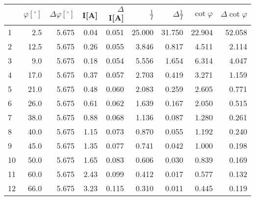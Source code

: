 \begin{tabular}{lrrrrrrrr}
\toprule
{} &  $\varphi[^\circ]$ &  $\Delta \varphi[^\circ]$ &  I[A] &  $\Delta$I[A] &  $\frac{1}{I}$ &  $\Delta \frac{1}{I}$ &  $\cot{\varphi}$ &  $\Delta \cot{\varphi}$ \\
\midrule
1  &                2.5 &                     5.675 &  0.04 &         0.051 &         25.000 &                31.750 &           22.904 &                  52.058 \\
2  &               12.5 &                     5.675 &  0.26 &         0.055 &          3.846 &                 0.817 &            4.511 &                   2.114 \\
3  &                9.0 &                     5.675 &  0.18 &         0.054 &          5.556 &                 1.654 &            6.314 &                   4.047 \\
4  &               17.0 &                     5.675 &  0.37 &         0.057 &          2.703 &                 0.419 &            3.271 &                   1.159 \\
5  &               21.0 &                     5.675 &  0.48 &         0.060 &          2.083 &                 0.259 &            2.605 &                   0.771 \\
6  &               26.0 &                     5.675 &  0.61 &         0.062 &          1.639 &                 0.167 &            2.050 &                   0.515 \\
7  &               38.0 &                     5.675 &  0.88 &         0.068 &          1.136 &                 0.087 &            1.280 &                   0.261 \\
8  &               40.0 &                     5.675 &  1.15 &         0.073 &          0.870 &                 0.055 &            1.192 &                   0.240 \\
9  &               45.0 &                     5.675 &  1.35 &         0.077 &          0.741 &                 0.042 &            1.000 &                   0.198 \\
10  &               50.0 &                     5.675 &  1.65 &         0.083 &          0.606 &                 0.030 &            0.839 &                   0.169 \\
11 &               60.0 &                     5.675 &  2.43 &         0.099 &          0.412 &                 0.017 &            0.577 &                   0.132 \\
12 &               66.0 &                     5.675 &  3.23 &         0.115 &          0.310 &                 0.011 &            0.445 &                   0.119 \\
\bottomrule
\end{tabular}
